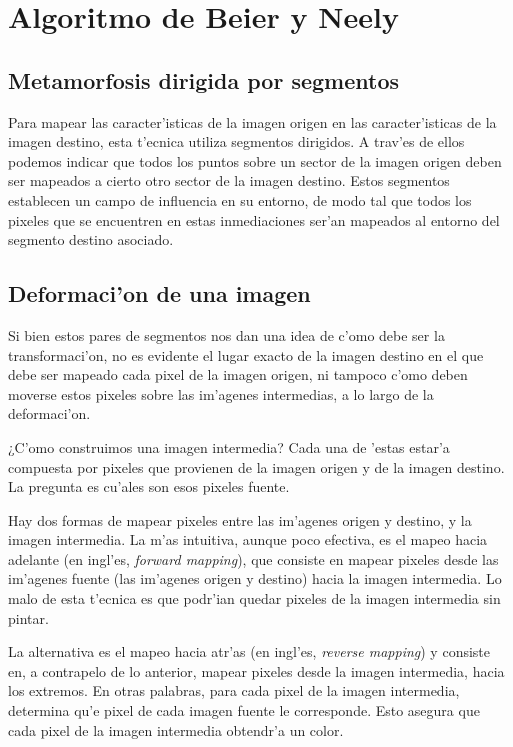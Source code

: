 \section{Algoritmo de Beier y Neely}

\subsection{Metamorfosis dirigida por segmentos}

Para mapear las caracter'isticas de la imagen origen en las caracter'isticas de la imagen destino, esta t'ecnica utiliza segmentos dirigidos. A trav'es de ellos podemos indicar que todos los puntos sobre un sector de la imagen origen deben ser mapeados a cierto otro sector de la imagen destino. Estos segmentos establecen un campo de influencia en su entorno, de modo tal que todos los pixeles que se encuentren en estas inmediaciones ser'an mapeados al entorno del segmento destino asociado.

\subsection{Deformaci'on de una imagen}

Si bien estos pares de segmentos nos dan una idea de c'omo debe ser la transformaci'on, no es evidente el lugar exacto de la imagen destino en el que debe ser mapeado cada pixel de la imagen origen, ni tampoco c'omo deben moverse estos pixeles sobre las im'agenes intermedias, a lo largo de la deformaci'on.

¿C'omo construimos una imagen intermedia? Cada una de 'estas estar'a compuesta por pixeles que provienen de la imagen origen y de la imagen destino. La pregunta es cu'ales son esos pixeles fuente.

Hay dos formas de mapear pixeles entre las im'agenes origen y destino, y la imagen intermedia. La m'as intuitiva, aunque poco efectiva, es el mapeo hacia adelante (en ingl'es, \textit{forward mapping}), que consiste en mapear pixeles desde las im'agenes fuente (las im'agenes origen y destino) hacia la imagen intermedia. Lo malo de esta t'ecnica es que podr'ian quedar pixeles de la imagen intermedia sin pintar.

La alternativa es el mapeo hacia atr'as (en ingl'es, \textit{reverse mapping}) y consiste en, a contrapelo de lo anterior, mapear pixeles desde la imagen intermedia, hacia los extremos. En otras palabras, para cada pixel de la imagen intermedia, determina qu'e pixel de cada imagen fuente le corresponde. Esto asegura que cada pixel de la imagen intermedia obtendr'a un color.

